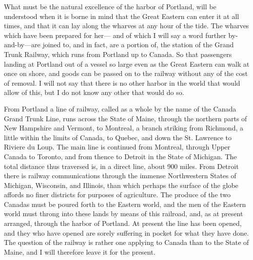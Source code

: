 What must be the natural excellence of the harbor of Portland, will
be understood when it is borne in mind that the Great Eastern can
enter it at all times, and that it can lay along the wharves at any
hour of the tide.  The wharves which have been prepared for her---%
and of which I will say a word further by-and-by---are joined to,
and in fact, are a portion of, the station of the Grand Trunk
Railway, which runs from Portland up to Canada.  So that passengers
landing at Portland out of a vessel so large even as the Great
Eastern can walk at once on shore, and goods can be passed on to
the railway without any of the cost of removal.  I will not say
that there is no other harbor in the world that would allow of
this, but I do not know any other that would do so.

From Portland a line of railway, called as a whole by the name of
the Canada Grand Trunk Line, runs across the State of Maine,
through the northern parts of New Hampshire and Vermont, to
Montreal, a branch striking from Richmond, a little within the
limits of Canada, to Quebec, and down the St. Lawrence to Riviere
du Loup.  The main line is continued from Montreal, through Upper
Canada to Toronto, and from thence to Detroit in the State of
Michigan.  The total distance thus traversed is, in a direct line,
about 900 miles.  From Detroit there is railway communications
through the immense Northwestern States of Michigan, Wisconsin, and
Illinois, than which perhaps the surface of the globe affords no
finer districts for purposes of agriculture.  The produce of the
two Canadas must be poured forth to the Eastern world, and the men
of the Eastern world must throng into these lands by means of this
railroad, and, as at present arranged, through the harbor of
Portland.  At present the line has been opened, and they who have
opened are sorely suffering in pocket for what they have done.  The
question of the railway is rather one applying to Canada than to
the State of Maine, and I will therefore leave it for the present.

